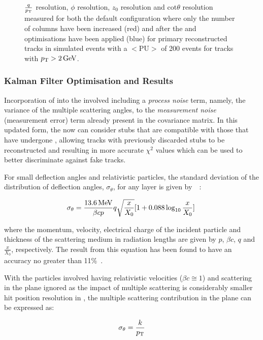 \begin{figure}[htb]
\caption{
$\frac{q}{p_{\mathrm{T}}}$ resolution, $\phi$ resolution, $z_{0}$ resolution and cot$\theta$ resolution measured for both the default configuration where only the number of \HT \qpt columns have been increased (red) and after the \HT and \KF optimisations have been applied (blue) for primary reconstructed tracks in simulated \ttbar events with a $<\textrm{PU}>$ of 200 events for tracks with $p_{\mathrm{T}} > 2\,\text{Ge\hspace{-.08em}V}$.
}
\label{fig:htHelixParametersResVsInvPt}
\end{figure}

\subsubsection{Kalman Filter Optimisation and Results}\label{subsubsec:lowPtOptKF}
Incorporation of \MS into the \KF involved including a \emph{process noise} term, namely, the variance of the multiple scattering angles, to the \emph{measurement noise} (\ie measurement error) term already present in the \KF covariance matrix.
In this updated form, the \KF now can consider stubs that are compatible with those that have undergone \MS, allowing tracks with previously discarded stubs to be reconstructed and resulting in more accurate $\chi^{2}$ values which can be used to better discriminate against fake tracks.

For small deflection angles and relativistic particles, the standard deviation of the distribution of deflection angles, $\sigma_{\theta}$, for any layer is given by~\cite{Lynch:1990sq}~:

\begin{equation}
\sigma_{\theta} = \frac{13.6\,\text{Me\hspace{-.08em}V}}{\beta c p} q \sqrt{\frac{x}{X_{0}}} [1 + 0.088 \log_{10}{\frac{x}{X_{0}}}]  \;
\label{eq:scatter1}
\end{equation}

where the momentum, velocity, electrical charge of the incident particle and thickness of the scattering medium in radiation lengths are given by $p$, $\beta c$, $q$ and $\frac{x}{X_{0}}$, respectively.
The result from this equation has been found to have an accuracy no greater than 11\%~\cite{Lynch:1990sq}.

With the particles involved having relativistic velocities (\ie $\beta c \cong 1$) and scattering in the \rz plane ignored as the impact of multiple scattering is considerably smaller hit position resolution in \rz, the multiple scattering contribution in the \rphi plane can be expressed as:

\begin{equation}
\sigma_{\theta} = \frac{k}{p_{\mathrm{T}}}
\label{eq:scatter2}
\end{equation}

